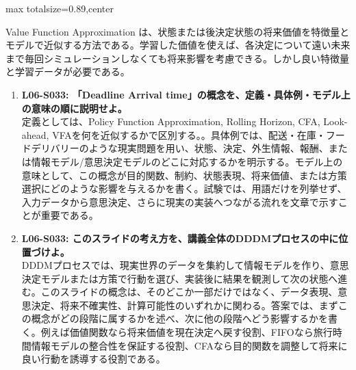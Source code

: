 \begin{minipage}[t]{0.58\textwidth}
\begin{adjustbox}{max totalsize={\textwidth}{0.89\textheight},center}
\begin{minipage}{\textwidth}
Value Function Approximation は、状態または後決定状態の将来価値を特徴量とモデルで近似する方法である。学習した価値を使えば、各決定について遠い未来まで毎回シミュレーションしなくても将来影響を考慮できる。しかし良い特徴量と学習データが必要である。\par{}\begin{enumerate}\item \textbf{L06-S033: 「Deadline Arrival time」の概念を、定義・具体例・モデル上の意味の順に説明せよ。}\\定義としては、Policy Function Approximation, Rolling Horizon, CFA, Look-ahead, VFAを何を近似するかで区別する。。具体例では、配送・在庫・フードデリバリーのような現実問題を用い、状態、決定、外生情報、報酬、または情報モデル/意思決定モデルのどこに対応するかを明示する。モデル上の意味として、この概念が目的関数、制約、状態表現、将来価値、または方策選択にどのような影響を与えるかを書く。試験では、用語だけを列挙せず、入力データから意思決定、さらに現実の実装へつながる流れを文章で示すことが重要である。\item \textbf{L06-S033: このスライドの考え方を、講義全体のDDDMプロセスの中に位置づけよ。}\\DDDMプロセスでは、現実世界のデータを集約して情報モデルを作り、意思決定モデルまたは方策で行動を選び、実装後に結果を観測して次の状態へ進む。このスライドの概念は、そのどこか一部だけではなく、データ表現、意思決定、将来不確実性、計算可能性のいずれかに関わる。答案では、まずこの概念がどの段階に属するかを述べ、次に他の段階へどう影響するかを書く。例えば価値関数なら将来価値を現在決定へ戻す役割、FIFOなら旅行時間情報モデルの整合性を保証する役割、CFAなら目的関数を調整して将来に良い行動を誘導する役割である。\end{enumerate}
\end{minipage}
\end{adjustbox}
\end{minipage}


